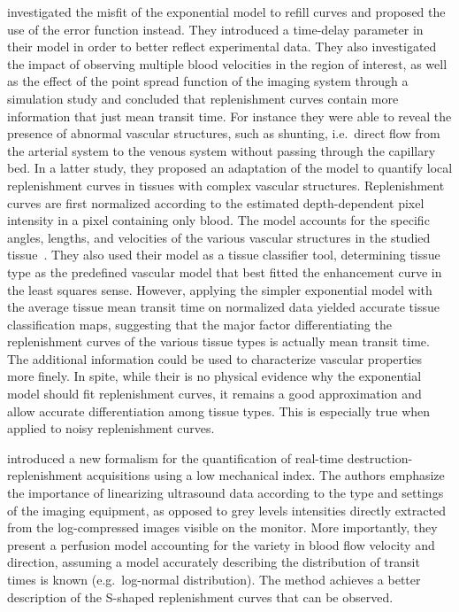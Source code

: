 \citet{Potdevin:2004eq} investigated the misfit of the exponential model to refill curves and proposed the use of the error function instead.
They introduced a time-delay parameter in their model in order to better reflect experimental data. 
They also investigated the impact of observing multiple blood velocities in the region of interest, as well as the effect of the point spread function of the imaging system through a simulation study and concluded that replenishment curves contain more information that just mean transit time. 
For instance they were able to reveal the presence of abnormal vascular structures, such as shunting, i.e.~direct flow from the arterial system to the venous system without passing through the capillary bed.
In a latter study, they proposed an adaptation of the model to quantify local replenishment curves in tissues with complex vascular structures.
Replenishment curves are first normalized according to the estimated depth-dependent pixel intensity in a pixel containing only blood.
The model accounts for the specific angles, lengths, and velocities of the various vascular structures in the studied tissue~\cite{Potdevin:2006fs}. %
They also used their model as a tissue classifier tool, determining tissue type as the predefined vascular model that best fitted the enhancement curve in the least squares sense.
However, applying the simpler exponential model with the average tissue mean transit time on normalized data yielded accurate tissue classification maps, suggesting that the major factor differentiating the replenishment curves of the various tissue types is actually mean transit time.
The additional information could be used to characterize vascular properties more finely.
In spite, while their is no physical evidence why the exponential model should fit replenishment curves, it remains a good approximation and allow accurate differentiation among tissue types.
This is especially true when applied to noisy replenishment curves.

\citet{Arditi:2006ip} introduced a new formalism for the quantification of real-time destruction-replenishment acquisitions using a low mechanical index. %
The authors emphasize the importance of linearizing ultrasound data according to the type and settings of the imaging equipment, as opposed to grey levels intensities directly extracted from the log-compressed images visible on the monitor.
More importantly, they present a perfusion model accounting for the variety in blood flow velocity and direction, assuming a model accurately describing the distribution of transit times is known (e.g.~log-normal distribution).
The method achieves a better description of the S-shaped replenishment curves that can be observed.


